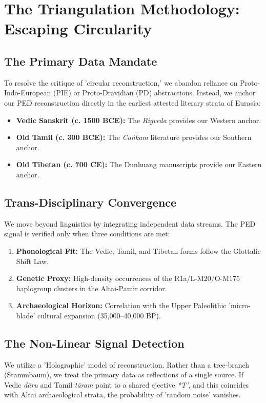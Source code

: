 \chapter{The Triangulation Methodology: Escaping Circularity}
\section{The Primary Data Mandate}
To resolve the critique of 'circular reconstruction,' we abandon reliance on Proto-Indo-European (PIE) or Proto-Dravidian (PD) abstractions. Instead, we anchor our PED reconstruction directly in the earliest attested literary strata of Eurasia:
\begin{itemize}
    \item \textbf{Vedic Sanskrit (c. 1500 BCE):} The \textit{Rigveda} provides our Western anchor.
    \item \textbf{Old Tamil (c. 300 BCE):} The \textit{Caṅkam} literature provides our Southern anchor.
    \item \textbf{Old Tibetan (c. 700 CE):} The Dunhuang manuscripts provide our Eastern anchor.
\end{itemize}

\section{Trans-Disciplinary Convergence}
We move beyond linguistics by integrating independent data streams. The PED signal is verified only when three conditions are met:
\begin{enumerate}
    \item \textbf{Phonological Fit:} The Vedic, Tamil, and Tibetan forms follow the Glottalic Shift Law.
    \item \textbf{Genetic Proxy:} High-density occurrences of the R1a/L-M20/O-M175 haplogroup clusters in the Altai-Pamir corridor.
    \item \textbf{Archaeological Horizon:} Correlation with the Upper Paleolithic 'micro-blade' cultural expansion (35,000--40,000 BP).
\end{enumerate}

\section{The Non-Linear Signal Detection}
We utilize a 'Holographic' model of reconstruction. Rather than a tree-branch (Stammbaum), we treat the primary data as reflections of a single source. If Vedic \textit{dāru} and Tamil \textit{tāram} point to a shared ejective \textit{*T'}, and this coincides with Altai archaeological strata, the probability of 'random noise' vanishes.
